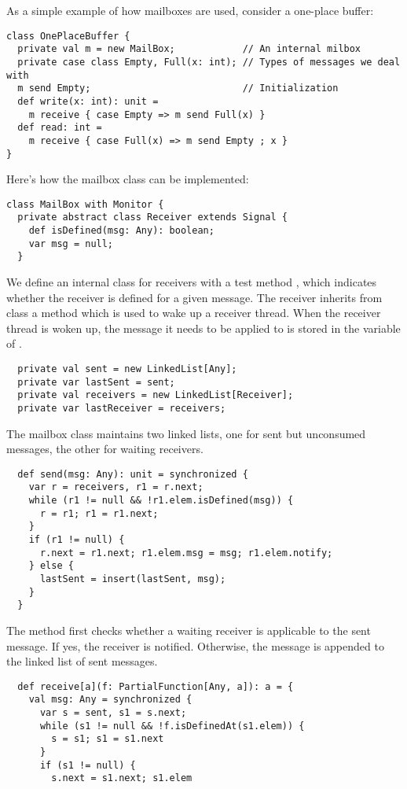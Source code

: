 \documentclass[a4paper,12pt,twoside,titlepage]{book}
\begin{document}
{As a simple example of how mailboxes are used, consider a
one-place buffer:
\begin{lstlisting}
class OnePlaceBuffer {
  private val m = new MailBox;            // An internal milbox
  private case class Empty, Full(x: int); // Types of messages we deal with
  m send Empty;                           // Initialization
  def write(x: int): unit =
    m receive { case Empty => m send Full(x) }
  def read: int =
    m receive { case Full(x) => m send Empty ; x }
}
\end{lstlisting}
Here's how the mailbox class can be implemented:
\begin{lstlisting}
class MailBox with Monitor {
  private abstract class Receiver extends Signal {
    def isDefined(msg: Any): boolean;
    var msg = null;
  }
\end{lstlisting}
We define an internal class for receivers with a test method
, which indicates whether the receiver is
defined for a given message.  The receiver inherits from class
 a  method which is used to wake up a
receiver thread. When the receiver thread is woken up, the message it
needs to be applied to is stored in the  variable of
.
\begin{lstlisting}
  private val sent = new LinkedList[Any];
  private var lastSent = sent;
  private val receivers = new LinkedList[Receiver];
  private var lastReceiver = receivers;
\end{lstlisting}
The mailbox class maintains two linked lists,
one for sent but unconsumed messages, the other for waiting receivers.
\begin{lstlisting}
  def send(msg: Any): unit = synchronized {
    var r = receivers, r1 = r.next;
    while (r1 != null && !r1.elem.isDefined(msg)) {
      r = r1; r1 = r1.next;
    }
    if (r1 != null) {
      r.next = r1.next; r1.elem.msg = msg; r1.elem.notify;
    } else {
      lastSent = insert(lastSent, msg);
    }
  }
\end{lstlisting}
The  method first checks whether a waiting receiver is
applicable to the sent message. If yes, the receiver is notified.
Otherwise, the message is appended to the linked list of sent messages.
\begin{lstlisting}
  def receive[a](f: PartialFunction[Any, a]): a = {
    val msg: Any = synchronized {
      var s = sent, s1 = s.next;
      while (s1 != null && !f.isDefinedAt(s1.elem)) {
        s = s1; s1 = s1.next
      }
      if (s1 != null) {
        s.next = s1.next; s1.elem

\end{lstlisting}}
\end{document}
